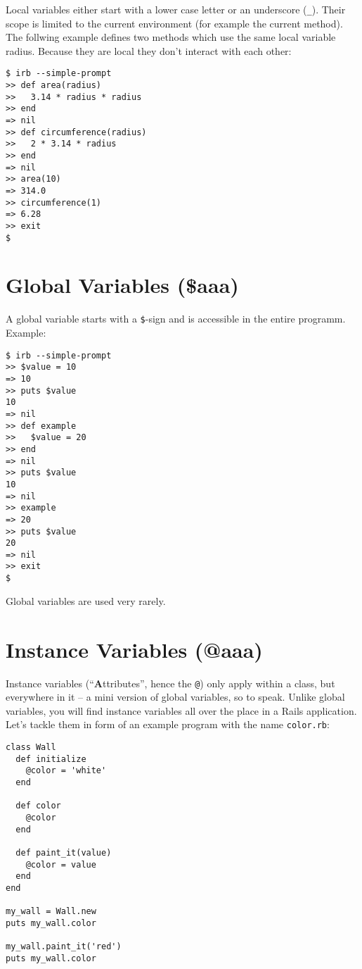 \documentclass[a4paper]{book}
\begin{document}
Local variables either start with a lower case letter or an underscore (\texttt{\_}). Their scope is limited to the current environment (for example the current method). The follwing example defines two methods which use the same local variable radius. Because they are local they don't interact with each other:

\begin{shaded}\begin{verbatim}
$ irb --simple-prompt
>> def area(radius)
>>   3.14 * radius * radius
>> end
=> nil
>> def circumference(radius)
>>   2 * 3.14 * radius
>> end
=> nil
>> area(10)
=> 314.0
>> circumference(1)
=> 6.28
>> exit
$
\end{verbatim}\end{shaded}

\section{Global Variables (\$aaa)}\label{global-variables-aaa}

A global variable starts with a \texttt{\$}-sign and is accessible in the entire programm. Example:

\begin{shaded}\begin{verbatim}
$ irb --simple-prompt
>> $value = 10
=> 10
>> puts $value
10
=> nil
>> def example
>>   $value = 20
>> end
=> nil
>> puts $value
10
=> nil
>> example
=> 20
>> puts $value
20
=> nil
>> exit
$
\end{verbatim}\end{shaded}

Global variables are used very rarely.

\section{Instance Variables (@aaa)}\label{instance-variables-aaa}

Instance variables (“\textbf{A}ttributes”, hence the \texttt{@}) only apply within a class, but everywhere in it -- a mini version of global variables, so to speak. Unlike global variables, you will find instance variables all over the place in a Rails application. Let's tackle them in form of an example program with the name \texttt{color.rb}:

\begin{shaded}\begin{verbatim}
class Wall
  def initialize
    @color = 'white'
  end

  def color
    @color
  end

  def paint_it(value)
    @color = value
  end
end

my_wall = Wall.new
puts my_wall.color

my_wall.paint_it('red')
puts my_wall.color
\end{verbatim}\end{shaded}
\end{document}
